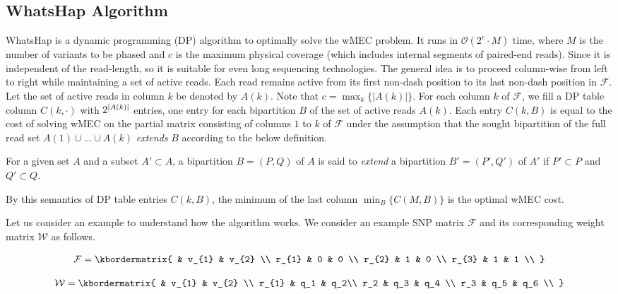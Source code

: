 	
\subsection{WhatsHap Algorithm}\label{sec:algorithm}
WhatsHap \citep{Patterson2015} is a dynamic programming (DP) algorithm to optimally solve the wMEC problem.
It runs in $\mathcal{O}(2^c\cdot M)$ time, where $M$ is the number of variants to be phased and $c$ is the maximum physical coverage (which includes internal segments of paired-end reads).
Since it is independent of the read-length, so it is suitable for even long sequencing technologies.
The general idea is to proceed column-wise from left to right while maintaining a set of active reads.
Each read remains active from its first non-dash position to its last non-dash position in $\mathcal{F}$.
Let the set of active reads in column $k$ be denoted by $A(k)$.
Note that $c=\max_{k}\{|A(k)|\}$.
For each column $k$ of $\mathcal{F}$, we fill a DP table column $C(k,\cdot)$ with $2^{\left\lvert A(k) \right\rvert}$ entries, one entry for each bipartition $B$ of the set of active reads $A(k)$.
Each entry $C(k,B)$ is equal to the cost of solving wMEC on the partial matrix consisting of columns $1$ to $k$ of $\mathcal{F}$ under the assumption that the sought bipartition of the full read set $A(1)\cup\ldots\cup A(k)$ \emph{extends} $B$ according to the below definition.
\begin{definition}
For a given set $A$ and a subset $A'\subset A$, a bipartition $B=(P,Q)$ of $A$ is said to \emph{extend} a bipartition $B'=(P',Q')$ of $A'$ if $P'\subset P$ and $Q'\subset Q$.
\label{def:bipartite-extend}
\end{definition}
By this semantics of DP table entries $C(k,B)$, the minimum of the last column $\min_B\{C(M,B)\}$ is the optimal wMEC cost.

Let us consider an example to understand how the algorithm works. We consider an example SNP matrix $\mathcal{F}$ and its corresponding weight matrix $\mathcal{W}$ as follows.

\begin{equation}\label{eq:snp_matrix}
  \mathcal{F}  = \kbordermatrix{
     & v_{1}       & v_{2}  \\
    r_{1}       & 0 & 0 \\
    r_{2}       & 1 & 0 \\
    r_{3}       & 1 & 1 \\
  }
\end{equation}

\begin{equation}\label{eq:snp_weight_matrix}
  \mathcal{W}  = \kbordermatrix{
     & v_{1}       & v_{2}  \\
    r_{1}       & q_1 &  q_2\\
    r_2 & q_3 & q_4 \\
    r_3 & q_5 & q_6 \\
  }
\end{equation}

